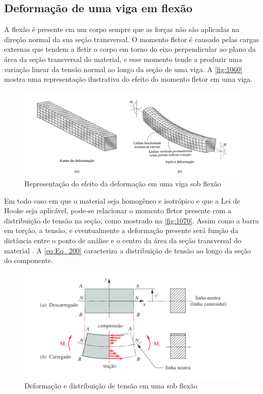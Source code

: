 \subsection{Deformação de uma viga em flexão}

A flexão é presente em um corpo sempre que as forças não são aplicadas na direção normal da sua seção transversal.
O momento fletor é causado pelas cargas externas que tendem a fletir o corpo em torno do eixo perpendicular ao plano da
área da seção transversal do material, e esse momento tende a produzir uma variação linear da tensão normal ao longo da
seção de uma viga. \autocite{Hibbeler2010}
A \autoref{fig:1060} mostra uma representação ilustrativa do efeito do momento fletor em uma viga.

\begin{figure}[htb]
	\caption{\label{fig:1060} Representação do efeito da deformação em uma viga sob flexão}
	\begin{center}
		\includegraphics[width=\textwidth]{pictures/1060.png}
	\end{center}
\end{figure}

Em todo caso em que o material seja homogêneo e isotrópico e que a Lei de Hooke seja aplicável, pode-se relacionar o momento fletor presente com a distribuição de
tensão na seção, como mostrado na \autoref{fig:1070}. Assim como a barra em torção, a tensão, e eventualmente a deformação presente será função da distância entre o
ponto de análise e o centro da área da seção transversal do material \autocite{Hibbeler2010}.
A \autoref{eq:Eq_200} caracteriza a distribuição de tensão ao longo da seção do componente.

\begin{figure}[htb]
	\caption{\label{fig:1070} Deformação e distribuição de tensão em uma sob flexão}
	\begin{center}
		\includegraphics[width=\textwidth]{pictures/1070.png}
	\end{center}
\end{figure}


